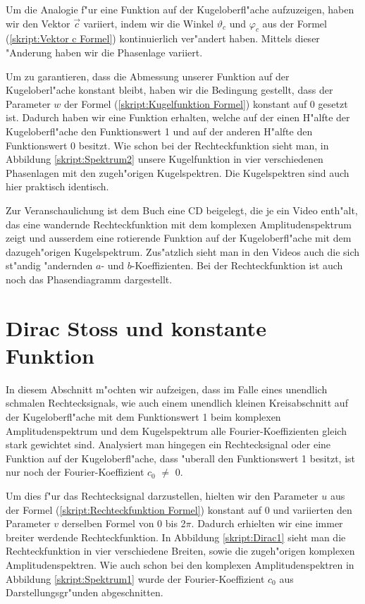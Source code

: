 \begin{refsection}
Um die Analogie f"ur eine Funktion auf der Kugeloberfl"ache aufzuzeigen, 
haben wir den Vektor $\vec{c}$ variiert, indem wir die Winkel $\vartheta_c$
und $\varphi_c$ aus der Formel (\ref{skript:Vektor c Formel}) 
kontinuierlich ver"andert haben. 
Mittels dieser "Anderung haben wir die Phasenlage variiert.
 
Um zu garantieren, dass die Abmessung unserer Funktion auf der 
Kugeloberl"ache konstant bleibt, haben wir die Bedingung gestellt,
dass der Parameter $w$ der Formel (\ref{skript:Kugelfunktion Formel}) 
konstant auf 0 gesetzt ist. 
Dadurch haben wir eine Funktion erhalten, welche auf der einen 
H"alfte der Kugeloberfl"ache den Funktionswert 1 und auf der 
anderen H"alfte den Funktionswert 0 besitzt. 
Wie schon bei der Rechteckfunktion sieht man, in Abbildung 
\ref{skript:Spektrum2}  
unsere Kugelfunktion in vier verschiedenen Phasenlagen mit den 
zugeh"origen Kugelspektren.
Die Kugelspektren sind auch hier praktisch identisch. 

Zur Veranschaulichung ist dem Buch eine CD beigelegt,
die je ein Video enth"alt, das eine wandernde 
Rechteckfunktion mit dem komplexen Amplitudenspektrum zeigt und
ausserdem eine rotierende Funktion auf der Kugeloberfl"ache mit 
dem  dazugeh"origen Kugelspektrum. 
Zus"atzlich sieht man in den Videos auch
die sich st"andig "andernden $a$- und $b$-Koeffizienten. Bei der 
Rechteckfunktion ist auch noch das Phasendiagramm dargestellt.


\section{Dirac Stoss und konstante Funktion}
In diesem Abschnitt m"ochten wir aufzeigen, dass im Falle eines 
unendlich schmalen Rechtecksignals, wie auch einem unendlich kleinen 
Kreisabschnitt auf der Kugeloberfl"ache mit dem Funktionswert 1 beim 
komplexen Amplitudenspektrum und dem Kugelspektrum alle 
Fourier-Koeffizienten gleich stark gewichtet sind. 
Analysiert man hingegen ein Rechtecksignal oder eine Funktion auf der 
Kugeloberfl"ache, dass "uberall den Funktionswert 1 besitzt, ist nur 
noch der Fourier-Koeffizient $c_0$ $\neq$ 0.

Um dies f"ur das Rechtecksignal darzustellen, hielten wir den Parameter
$u$ aus der Formel (\ref{skript:Rechteckfunktion Formel}) konstant auf 0 
und variierten den Parameter $v$ derselben Formel von 0 bis 2$\pi$. 
Dadurch erhielten wir eine immer breiter werdende Rechteckfunktion. 
In Abbildung \ref{skript:Dirac1} sieht man die Rechteckfunktion in 
vier verschiedene Breiten, sowie die zugeh"origen komplexen 
Amplitudenspektren. 
Wie auch schon bei den komplexen Amplitudenspektren in Abbildung
\ref{skript:Spektrum1} wurde der Fourier-Koeffizient $c_0$ aus 
Darstellungsgr"unden abgeschnitten.


\end{refsection}
